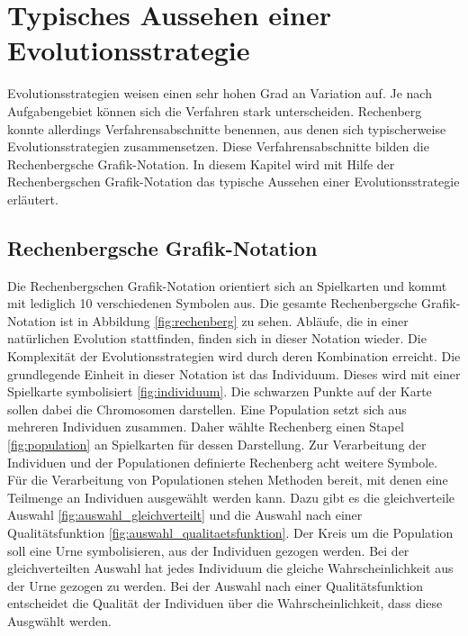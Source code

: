 \section{Typisches Aussehen einer Evolutionsstrategie}
Evolutionsstrategien weisen einen sehr hohen Grad an Variation auf. Je nach Aufgabengebiet können sich die Verfahren stark unterscheiden.
Rechenberg konnte allerdings Verfahrensabschnitte benennen, aus denen sich typischerweise Evolutionsstrategien zusammensetzen.
Diese Verfahrensabschnitte bilden die Rechenbergsche Grafik-Notation. In diesem Kapitel wird mit Hilfe der Rechenbergschen Grafik-Notation das typische Aussehen einer Evolutionsstrategie erläutert.

\subsection{Rechenbergsche Grafik-Notation}
Die  Rechenbergschen Grafik-Notation orientiert sich an Spielkarten und kommt mit lediglich 10 verschiedenen Symbolen aus.
Die gesamte Rechenbergsche Grafik-Notation ist in Abbildung \ref{fig:rechenberg} zu sehen. Abläufe, die in einer natürlichen Evolution stattfinden, finden sich in dieser Notation wieder.
Die Komplexität der Evolutionsstrategien wird durch deren Kombination erreicht.
Die grundlegende Einheit in dieser Notation ist das Individuum. Dieses wird mit einer Spielkarte symbolisiert \ref{fig:individuum}. Die schwarzen Punkte auf der Karte sollen dabei die Chromosomen darstellen.
Eine Population setzt sich aus mehreren Individuen zusammen. Daher wählte Rechenberg einen Stapel \ref{fig:population} an Spielkarten für dessen Darstellung. Zur Verarbeitung der Individuen und der Populationen definierte Rechenberg acht weitere Symbole.
Für die Verarbeitung von Populationen stehen Methoden bereit, mit denen eine Teilmenge an Individuen ausgewählt werden kann. Dazu gibt es die gleichverteile Auswahl \ref{fig:auswahl_gleichverteilt} und die Auswahl nach einer Qualitätsfunktion \ref{fig:auswahl_qualitaetsfunktion}.
Der Kreis um die Population soll eine Urne symbolisieren, aus der Individuen gezogen werden. Bei der gleichverteilten Auswahl hat jedes Individuum die gleiche Wahrscheinlichkeit aus der Urne gezogen zu werden. Bei der Auswahl nach einer Qualitätsfunktion entscheidet die Qualität der Individuen über die Wahrscheinlichkeit, dass diese Ausgwählt werden.
